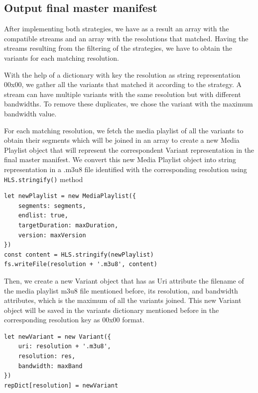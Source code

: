 \subsection{Output final master manifest}

After implementing both strategies, we have as a result an array with the compatible streams and an array with the resolutions that matched.
Having the streams resulting from the filtering of the strategies, we have to obtain the variants for each matching resolution.

With the help of a dictionary with key the resolution as string representation 00x00, we gather all the variants that matched it according to the strategy. A stream can have multiple variants with the same resolution but with different bandwidths. To remove these duplicates, we chose the variant with the maximum bandwidth value.

For each matching resolution, we fetch the media playlist of all the variants to obtain their segments which will be joined in an array to create a new Media Playlist object that will represent the correspondent Variant representation in the final master manifest. We convert this new Media Playlist object into string representation in a .m3u8 file identified with the corresponding resolution using \Verb|HLS.stringify()| method

\begin{lstlisting}
let newPlaylist = new MediaPlaylist({
    segments: segments,
    endlist: true,
    targetDuration: maxDuration,
    version: maxVersion
})
const content = HLS.stringify(newPlaylist)
fs.writeFile(resolution + '.m3u8', content)
\end{lstlisting}

Then, we create a new Variant object that has as Uri attribute the filename of the media playlist m3u8 file mentioned before, its resolution, and bandwidth attributes, which is the maximum of all the variants joined. This new Variant object will be saved in the variants dictionary mentioned before in the corresponding resolution key as 00x00 format.

\begin{lstlisting}
let newVariant = new Variant({
    uri: resolution + '.m3u8',
    resolution: res,
    bandwidth: maxBand
})
repDict[resolution] = newVariant
\end{lstlisting}

